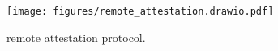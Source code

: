 









\begin{figure}[t!]
    \centering
    \texttt{[image: figures/remote\_attestation.drawio.pdf]}
    \caption{\trustednic{} remote attestation protocol.}
    \label{fig:remote_attestation}
\end{figure}

